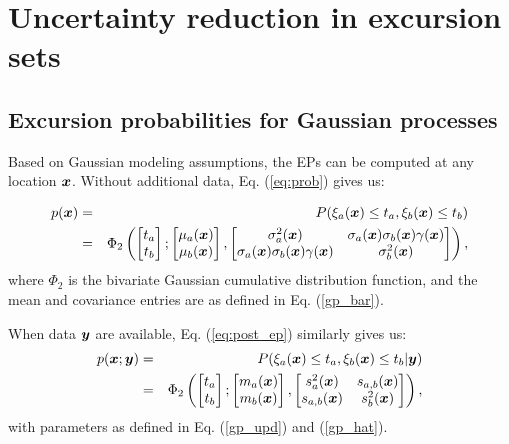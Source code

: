 \documentclass[aoas]{imsart}
\begin{document}
\section{Uncertainty reduction in excursion sets}
\label{sec:sur}

\subsection{Excursion probabilities for Gaussian processes}

Based on Gaussian modeling assumptions, the EPs can be computed at any
location ${\boldsymbol x}$. Without additional data, Eq.  (\ref{eq:prob}) gives us:

\begin{eqnarray}\label{eq:prob_mv0}
 p(\bx) &=& P(\xi_a(\bx) \leq t_a, \xi_b(\bx) \leq t_b) \nonumber \\
 &=& \Phi_2 \begin{pmatrix} 
\begin{bmatrix} t_a\\
t_b
\end{bmatrix};
\begin{bmatrix} \mu_{a}(\bx)\\
\mu_{b}(\bx)
\end{bmatrix},\begin{bmatrix}
\sigma_{a}^2(\bx) & \sigma_{a}(\bx)\sigma_{b}(\bx) \gamma(\bx)  \\
\sigma_{a}(\bx)\sigma_{b}(\bx) \gamma(\bx)  & \sigma_{b}^2(\bx)  
\end{bmatrix}\end{pmatrix},
\end{eqnarray}
where $\Phi_2$ is the bivariate Gaussian cumulative distribution
function, and the mean and covariance entries are as defined in Eq. (\ref{gp_bar}).

When data ${\boldsymbol y}$ are available, Eq. (\ref{eq:post_ep}) similarly gives
us:
\begin{eqnarray}\label{eq:prob_mv}
 p(\bx;\by) &=& P(\xi_a(\bx) \leq t_a, \xi_b(\bx) \leq t_b |\by)
 \nonumber \\
 &=& \Phi_2 \begin{pmatrix} 
\begin{bmatrix} t_a\\
t_b
\end{bmatrix};
\begin{bmatrix} m_{a}(\bx)\\
m_{b}(\bx)
\end{bmatrix},\begin{bmatrix}
s_{a}^2(\bx) & s_{a,b}(\bx)  \\
s_{a,b}(\bx)  & s_{b}^2(\bx)  
\end{bmatrix}\end{pmatrix},
\end{eqnarray}
with parameters as defined in Eq. (\ref{gp_upd}) and (\ref{gp_hat}).
\end{document}
